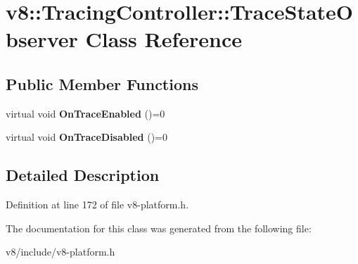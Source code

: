 \hypertarget{classv8_1_1TracingController_1_1TraceStateObserver}{}\section{v8\+:\+:Tracing\+Controller\+:\+:Trace\+State\+Observer Class Reference}
\label{classv8_1_1TracingController_1_1TraceStateObserver}
\subsection*{Public Member Functions}
\begin{DoxyCompactItemize}
\item 
\mbox{\label{classv8_1_1TracingController_1_1TraceStateObserver_a3853d90b9458529203fd1c4bc8caf4e3}} 
virtual void {\bfseries On\+Trace\+Enabled} ()=0
\item 
\mbox{\label{classv8_1_1TracingController_1_1TraceStateObserver_a840a68c822844e57e4b023dc4f9e0fee}} 
virtual void {\bfseries On\+Trace\+Disabled} ()=0
\end{DoxyCompactItemize}


\subsection{Detailed Description}


Definition at line 172 of file v8-\/platform.\+h.



The documentation for this class was generated from the following file\+:\begin{DoxyCompactItemize}
\item 
v8/include/v8-\/platform.\+h\end{DoxyCompactItemize}
